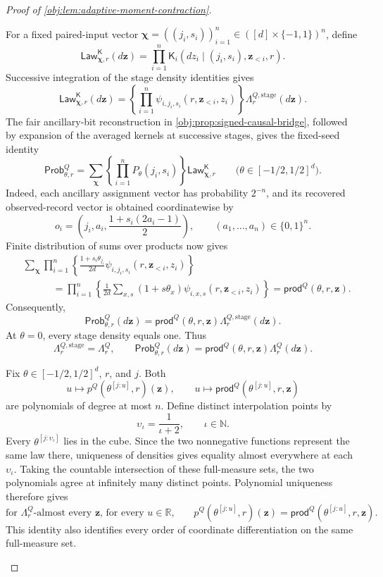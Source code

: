 \documentclass[11pt]{article}
\begin{document}
\begin{proof}[Proof of \cref{obj:lem:adaptive-moment-contraction}]
\begin{enumerate}
For a fixed paired-input vector
\(\boldsymbol\chi=((j_i,s_i))_{i=1}^n
 \in([d]\times\{-1,1\})^n\), define
\[
\mathsf{Law}^{\mathsf K}_{\boldsymbol\chi,r}(d\mathbf z)
=\prod_{i=1}^n
 \mathsf K_i(dz_i\mid(j_i,s_i),\mathbf z_{<i},r).
\]
Successive integration of the stage density identities gives
\[
\mathsf{Law}^{\mathsf K}_{\boldsymbol\chi,r}(d\mathbf z)
=
\left\{\prod_{i=1}^n
 \psi_{i,j_i,s_i}(r,\mathbf z_{<i},z_i)\right\}
 \Lambda_r^{Q,\mathrm{stage}}(d\mathbf z).
\]
The fair ancillary-bit reconstruction in
\cref{obj:prop:signed-causal-bridge}, followed by expansion of the averaged kernels at successive stages, gives the fixed-seed identity
\[
\mathsf{Prob}^Q_{\theta,r}
=
\sum_{\boldsymbol\chi}
 \left\{\prod_{i=1}^nP_\theta(j_i,s_i)\right\}
 \mathsf{Law}^{\mathsf K}_{\boldsymbol\chi,r}
\qquad
\bigl(\theta\in[-1/2,1/2]^d\bigr).
\]
Indeed, each ancillary assignment vector has probability \(2^{-n}\), and its recovered observed-record vector is obtained coordinatewise by
\[
o_i
=\left(j_i,a_i,\frac{1+s_i(2a_i-1)}2\right),
\qquad
(a_1,\ldots,a_n)\in\{0,1\}^n.
\]
Finite distribution of sums over products now gives
\[
\begin{split}
&\sum_{\boldsymbol\chi}
 \prod_{i=1}^n
 \left\{
 \frac{1+s_i\theta_{j_i}}{2d}
 \psi_{i,j_i,s_i}(r,\mathbf z_{<i},z_i)
 \right\}\\
&\hspace{3em}
=\prod_{i=1}^n
 \left\{\frac1{2d}\sum_{x,s}
 (1+s\theta_x)\psi_{i,x,s}(r,\mathbf z_{<i},z_i)\right\}
=\mathsf{prod}^Q(\theta,r,\mathbf z).
\end{split}
\]
Consequently,
\[
\mathsf{Prob}^Q_{\theta,r}(d\mathbf z)
=\mathsf{prod}^Q(\theta,r,\mathbf z)
 \Lambda_r^{Q,\mathrm{stage}}(d\mathbf z).
\]
At \(\theta=0\), every stage density equals one. Thus
\[
\Lambda_r^{Q,\mathrm{stage}}=\Lambda_r^Q,
\qquad
\mathsf{Prob}^Q_{\theta,r}(d\mathbf z)
=\mathsf{prod}^Q(\theta,r,\mathbf z)\Lambda_r^Q(d\mathbf z).
\]

Fix \(\theta\in[-1/2,1/2]^d\), \(r\), and \(j\). Both
\[
u\longmapsto p^Q(\theta^{[j:u]},r)(\mathbf z),
\qquad
u\longmapsto\mathsf{prod}^Q(\theta^{[j:u]},r,\mathbf z)
\]
are polynomials of degree at most \(n\). Define distinct interpolation points by
\[
\upsilon_\iota=\frac1{\iota+2},
\qquad \iota\in\mathbb N.
\]
Every \(\theta^{[j:\upsilon_\iota]}\) lies in the cube. Since the two nonnegative functions represent the same law there, uniqueness of densities gives equality almost everywhere at each \(\upsilon_\iota\). Taking the countable intersection of these full-measure sets, the two polynomials agree at infinitely many distinct points. Polynomial uniqueness therefore gives
\[
\text{for \(\Lambda_r^Q\)-almost every \(\mathbf z\), for every \(u\in\mathbb R\),}\qquad
p^Q(\theta^{[j:u]},r)(\mathbf z)
=\mathsf{prod}^Q(\theta^{[j:u]},r,\mathbf z).
\]
This identity also identifies every order of coordinate differentiation on the same full-measure set.


\end{enumerate}
\end{proof}
\end{document}
